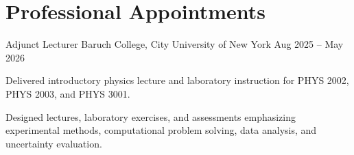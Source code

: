 \section{Professional Appointments}

\begin{workexperience}
  {Adjunct Lecturer}
  {Baruch College, City University of New York}
  {Aug 2025 -- May 2026}

  \item Delivered introductory physics lecture and laboratory instruction for PHYS 2002, PHYS 2003, and PHYS 3001.

  \item Designed lectures, laboratory exercises, and assessments emphasizing
  experimental methods, computational problem solving, data analysis, and
  uncertainty evaluation.
\end{workexperience}